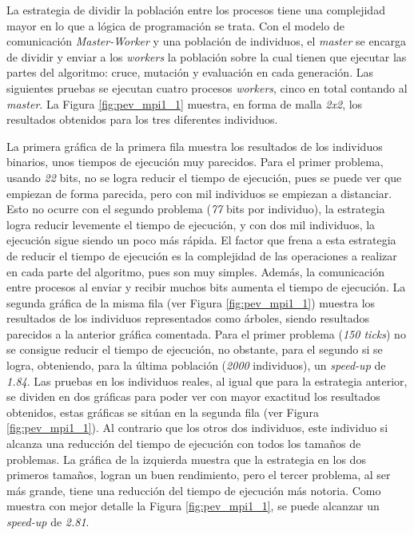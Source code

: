\newpage



La estrategia de dividir la población entre los procesos tiene una complejidad mayor en lo que a lógica de programación se trata. Con el modelo de comunicación \textit{Master-Worker} y una población de individuos, el \textit{master} se encarga de dividir y enviar a los \textit{workers} la población sobre la cual tienen que ejecutar las partes del algoritmo: cruce, mutación y evaluación en cada generación. Las siguientes pruebas se ejecutan cuatro procesos \textit{workers}, cinco en total contando al \textit{master}. La Figura \ref{fig:pev_mpi1_1} muestra, en forma de malla \textit{2x2}, los resultados obtenidos para los tres diferentes individuos. 

La primera gráfica de la primera fila muestra los resultados de los individuos binarios, unos tiempos de ejecución muy parecidos. Para el primer problema, usando \textit{22} bits, no se logra reducir el tiempo de ejecución, pues se puede ver que empiezan de forma parecida, pero con mil individuos se empiezan a distanciar. Esto no ocurre con el segundo problema (\textit{77} bits por individuo), la estrategia logra reducir levemente el tiempo de ejecución, y con dos mil individuos, la ejecución sigue siendo un poco más rápida. El factor que frena a esta estrategia de reducir el tiempo de ejecución es la complejidad de las operaciones a realizar en cada parte del algoritmo, pues son muy simples. Además, la comunicación entre procesos al enviar y recibir muchos bits aumenta el tiempo de ejecución. La segunda gráfica de la misma fila (ver Figura \ref{fig:pev_mpi1_1}) muestra los resultados de los individuos representados como árboles, siendo resultados parecidos a la anterior gráfica comentada. Para el primer problema (\textit{150 ticks}) no se consigue reducir el tiempo de ejecución, no obstante, para el segundo si se logra, obteniendo, para la última población (\textit{2000} individuos), un \textit{speed-up} de \textit{1.84}. Las pruebas en los individuos reales, al igual que para la estrategia anterior, se dividen en dos gráficas para poder ver con mayor exactitud los resultados obtenidos, estas gráficas se sitúan en la segunda fila (ver Figura \ref{fig:pev_mpi1_1}). Al contrario que los otros dos individuos, este individuo si alcanza una reducción del tiempo de ejecución con todos los tamaños de problemas. La gráfica de la izquierda muestra que la estrategia en los dos primeros tamaños, logran un buen rendimiento, pero el tercer problema, al ser más grande, tiene una reducción del tiempo de ejecución más notoria. Como muestra con mejor detalle la Figura \ref{fig:pev_mpi1_1}, se puede alcanzar un \textit{speed-up} de \textit{2.81}.


